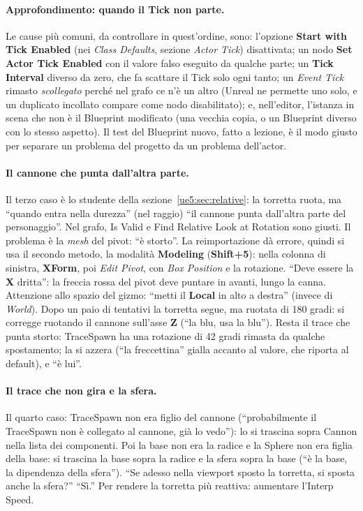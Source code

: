 \paragraph{Approfondimento: quando il Tick non parte.} Le cause più comuni, da
controllare in quest'ordine, sono: l'opzione \textbf{Start with Tick Enabled} (nei
\emph{Class Defaults}, sezione \emph{Actor Tick}) disattivata; un nodo \textbf{Set Actor
Tick Enabled} con il valore falso eseguito da qualche parte; un \textbf{Tick Interval}
diverso da zero, che fa scattare il Tick solo ogni tanto; un \emph{Event Tick} rimasto
\emph{scollegato} perché nel grafo ce n'è un altro (Unreal ne permette uno solo, e un
duplicato incollato compare come nodo disabilitato); e, nell'editor, l'istanza in scena
che non è il Blueprint modificato (una vecchia copia, o un Blueprint diverso con lo stesso
aspetto). Il test del Blueprint nuovo, fatto a lezione, è il modo giusto per separare un
problema del progetto da un problema dell'actor.

\paragraph{Il cannone che punta dall'altra parte.} Il terzo caso è lo studente della
sezione~\ref{ue5:sec:relative}: la torretta ruota, ma ``quando entra nella durezza''
(nel raggio) ``il cannone punta dall'altra parte del personaggio''. Nel grafo, Is Valid
e Find Relative Look at Rotation sono giusti. Il problema è la \emph{mesh} del pivot:
``è storto''. La reimportazione dà errore, quindi si usa il secondo metodo, la modalità
\textbf{Modeling} (\textbf{Shift+5}): nella colonna di sinistra, \textbf{XForm}, poi
\emph{Edit Pivot}, con \emph{Box Position} e la rotazione. ``Deve essere la \textbf{X}
dritta'': la freccia rossa del pivot deve puntare in avanti, lungo la canna. Attenzione
allo spazio del gizmo: ``metti il \textbf{Local} in alto a destra'' (invece di
\emph{World}). Dopo un paio di tentativi la torretta segue, ma ruotata di 180 gradi: si
corregge ruotando il cannone sull'asse \textbf{Z} (``la blu, usa la blu''). Resta il
trace che punta storto: TraceSpawn ha una rotazione di 42 gradi rimasta da qualche
spostamento; la si azzera (``la freccettina'' gialla accanto al valore, che riporta al
default), e ``è lui''.

\paragraph{Il trace che non gira e la sfera.} Il quarto caso: TraceSpawn non era figlio
del cannone (``probabilmente il TraceSpawn non è collegato al cannone, già lo vedo''): lo
si trascina sopra Cannon nella lista dei componenti. Poi la base non era la radice e la
Sphere non era figlia della base: si trascina la base sopra la radice e la sfera sopra la
base (``è la base, la dipendenza della sfera''). ``Se adesso nella viewport sposto la
torretta, si sposta anche la sfera?'' ``Sì.'' Per rendere la torretta più reattiva:
aumentare l'Interp Speed.

